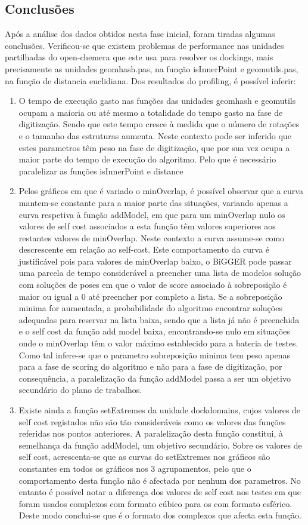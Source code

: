 \subsection{Conclusões}
Após a análise dos dados obtidos nesta fase inicial, foram tiradas algumas conclusões. Verificou-se que existem problemas de performance nas unidades partilhadas do open-chemera que este usa para resolver os dockings, mais precisamente as unidades geomhash.pas, na função isInnerPoint e geomutils.pas, na função de distancia euclidiana.
Dos resultados do profiling, é possível inferir:
\begin{enumerate}
	\item{O tempo de execução gasto nas funções das unidades geomhash e geomutils ocupam a maioria ou até mesmo a totalidade do tempo gasto na fase de digitização. Sendo que este tempo cresce à medida que o número de rotações e o tamanho das estruturas aumenta. Neste contexto pode ser inferido que estes parametros têm peso na fase de digitização, que por sua vez ocupa a maior parte do tempo de execução do algoritmo. Pelo que é necessário paralelizar as funções isInnerPoint e distance}
	\item{Pelos gráficos em que é variado o minOverlap, é possível observar que a curva mantem-se constante para a maior parte das situações, variando apenas a curva respetiva à função addModel, em que para um minOverlap nulo os valores de self cost associados a esta função têm valores superiores aos restantes valores de minOverlap. Neste contexto a curva assume-se como descrescente em relação ao self-cost. Este comportamento da curva é justificável pois para valores de minOverlap baixo, o BiGGER pode passar uma parcela de tempo considerável a preencher uma lista de modelos solução com soluções de poses em que o valor de score associado à sobreposição é maior ou igual a 0 até preencher por completo a lista. Se a sobreposição minima for aumentada, a probabilidade do algoritmo encontrar soluções adequadas para reservar na lista baixa, sendo que a lista já não é preenchida e o self cost da função add model baixa, encontrando-se nulo em situações onde o minOverlap têm o valor máximo establecido para a bateria de testes. Como tal infere-se que o parametro sobreposição minima tem peso apenas para a fase de scoring do algoritmo e não para a fase de digitização, por consequência, a paralelização da função addModel passa a ser um objetivo secundário do plano de trabalhos. }
	\item{Existe ainda a função setExtremes da unidade dockdomains, cujos valores de self cost registados não são tão consideráveis como os valores das funções referidas nos pontos anteriores. A paralelização desta função constitui, à semelhança da função addModel, um objetivo secundário. Sobre os valores de self cost, acrescenta-se que as curvas do setExtremes nos gráficos são constantes em todos os gráficos nos 3 agrupamentos, pelo que o comportamento desta função não é afectada por nenhum dos parametros. No entanto é possível notar a diferença dos valores de self cost nos testes em que foram usados complexos com formato cúbico para os com formato esférico. Deste modo conclui-se que é o formato dos complexos que afecta esta função. }

\end{enumerate}
